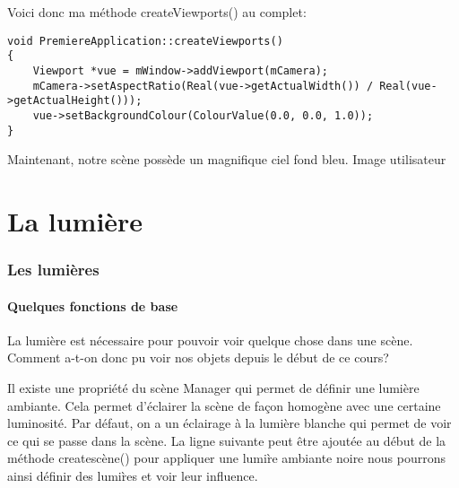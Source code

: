 \documentclass[10pt,a4paper]{report}
\begin{document}
Voici donc ma m\'ethode createViewports() au complet:
\begin{lstlisting}
void PremiereApplication::createViewports()
{
    Viewport *vue = mWindow->addViewport(mCamera);
    mCamera->setAspectRatio(Real(vue->getActualWidth()) / Real(vue->getActualHeight()));
    vue->setBackgroundColour(ColourValue(0.0, 0.0, 1.0));
}
\end{lstlisting}


Maintenant, notre sc\`ene poss\`ede un magnifique ciel fond bleu.
Image utilisateur


























\part{La lumi\`ere}



\section{Les lumi\`eres}


\subsection{Quelques fonctions de base}

La lumi\`ere est n\'ecessaire pour pouvoir voir quelque chose dans une sc\`ene. Comment a-t-on donc pu voir nos objets depuis le d\'ebut de ce cours?

Il existe une propri\'et\'e du sc\`ene Manager qui permet de d\'efinir une lumi\`ere ambiante. Cela permet d'\'eclairer la sc\`ene de fa\c{c}on homog\`ene avec une certaine luminosit\'e. Par d\'efaut, on a un \'eclairage \`{a} la lumi\`ere blanche qui permet de voir ce qui se passe dans la sc\`ene. La ligne suivante peut \^etre ajout\'ee au d\'ebut de la m\'ethode createsc\`ene() pour appliquer une lumi\`re ambiante noire nous pourrons ainsi d\'efinir des lumi\`res et voir leur influence.
\end{document}
